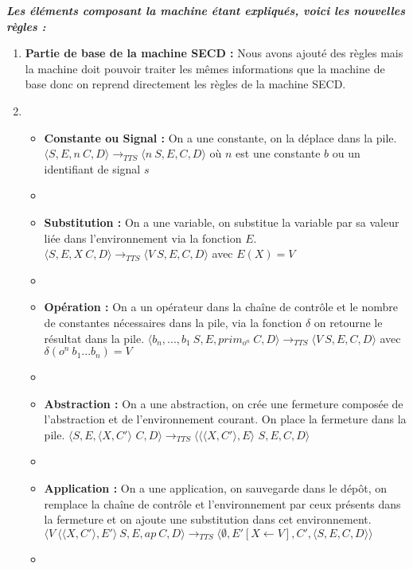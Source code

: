 \documentclass[10pt,a4paper]{report}
\begin{document}
	\bigbreak
	\bigbreak
	
	
	
	
	\textbf{\textit{Les éléments composant la machine étant expliqués, voici les nouvelles règles :}}
	\smallbreak
	\begin{enumerate}
		\item[] \textbf{Partie de base de la machine SECD :} Nous avons ajouté des règles mais la machine doit pouvoir traiter les mêmes informations que la machine de base donc on reprend directement les règles de la machine SECD. 
		\item[]
		\begin{itemize}
			\item[] \textbf{Constante ou Signal :} On a une constante, on la déplace dans la pile.
			\smallbreak
			$\langle S,E,n~C,D\rangle 
			\longrightarrow_{TTS} 
			\langle n~S,E,C,D\rangle$ où $n$ est une constante $b$ ou un identifiant de signal $s$
			\item[]
			
			\item[] \textbf{Substitution :} On a une variable, on substitue la variable par sa valeur liée dans l'environnement via la fonction $E$.
			\smallbreak
			$\langle S,E,X~C,D\rangle
			\longrightarrow_{TTS} 
			\langle V~S,E,C,D\rangle$ avec $E(X) = V$
			\item[]
			
			\item[] \textbf{Opération :} On a un opérateur dans la chaîne de contrôle et le nombre de constantes nécessaires dans la pile, via la fonction $\delta$ on retourne le résultat dans la pile.
			\smallbreak
			$\langle b_{n},...,b_{1}~S,E,prim_{o^{n}}~C,D\rangle
			\longrightarrow_{TTS} 
			\langle V~S,E,C,D\rangle$ avec $\delta(o^{n}~b_{1}...b_{n}) = V$
			\item[]
			
			\item[]  \textbf{Abstraction :} On a une abstraction, on crée une fermeture composée de l'abstraction et de l'environnement courant. On place la fermeture dans la pile.
			\smallbreak
			$\langle S,E,\langle X,C'\rangle$ $C,D\rangle
			\longrightarrow_{TTS} 
			\langle \langle\langle X,C'\rangle,E\rangle$ $S,E,C,D\rangle$
			\item[]
			
			\item[]  \textbf{Application :} On a une application, on sauvegarde dans le dépôt, on remplace la chaîne de contrôle et l'environnement par ceux présents dans la fermeture et on ajoute une substitution dans cet environnement.
			\smallbreak
			$\langle V~\langle\langle X,C'\rangle,E'\rangle~S,E,ap~C,D\rangle
			\longrightarrow_{TTS} 
			\langle \emptyset,E'[X \leftarrow V],C',\langle S,E,C,D\rangle\rangle$
			\item[] 
			

\end{itemize}
\end{enumerate}
\end{document}
